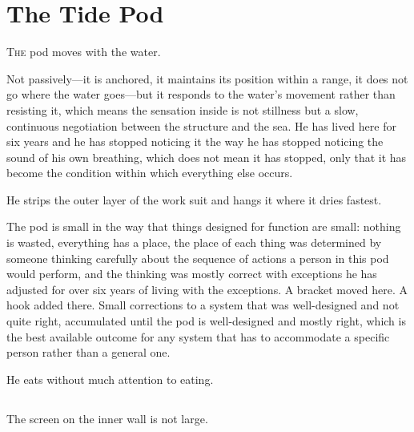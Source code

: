 
\chapter{The Tide Pod}


\lettrine{T}{he} pod moves with the water.

Not passively---it is anchored, it maintains its
position within a range, it does not go where the
water goes---but it responds to the water's movement
rather than resisting it, which means the sensation
inside is not stillness but a slow, continuous
negotiation between the structure and the sea. He
has lived here for six years and he has stopped
noticing it the way he has stopped noticing the
sound of his own breathing, which does not mean
it has stopped, only that it has become the
condition within which everything else occurs.

He strips the outer layer of the work suit and
hangs it where it dries fastest.

The pod is small in the way that things designed
for function are small: nothing is wasted, everything
has a place, the place of each thing was determined
by someone thinking carefully about the sequence of
actions a person in this pod would perform, and
the thinking was mostly correct with exceptions
he has adjusted for over six years of living with
the exceptions. A bracket moved here. A hook added
there. Small corrections to a system that was
well-designed and not quite right, accumulated
until the pod is well-designed and mostly right,
which is the best available outcome for any system
that has to accommodate a specific person rather
than a general one.

He eats without much attention to eating.

\section{}

The screen on the inner wall is not large.

